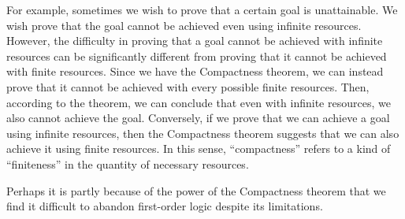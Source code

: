 For example, sometimes we wish to prove that a certain goal is unattainable. We wish prove that the goal cannot be achieved even using infinite resources. However, the difficulty in proving that a goal cannot be achieved with infinite resources can be significantly different from proving that it cannot be achieved with finite resources. Since we have the Compactness theorem, we can instead prove that it cannot be achieved with every possible finite resources. Then, according to the theorem, we can conclude that even with infinite resources, we also cannot achieve the goal. Conversely, if we prove that we can achieve a goal using infinite resources, then the Compactness theorem suggests that we can also achieve it using finite resources. In this sense, ``compactness'' refers to a kind of ``finiteness'' in the quantity of necessary resources.

Perhaps it is partly because of the power of the Compactness theorem that we find it difficult to abandon first-order logic despite its limitations.
